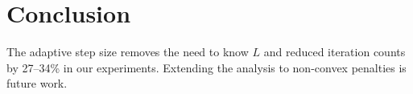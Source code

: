 \section{Conclusion}
\label{sec:conclusion}

The adaptive step size removes the need to know $L$ and reduced iteration
counts by 27--34\% in our experiments. Extending the analysis to non-convex
penalties is future work.

